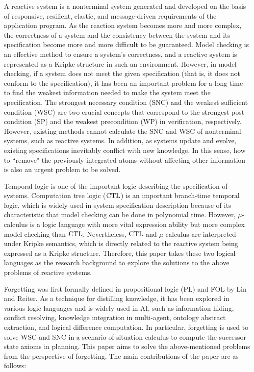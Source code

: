 \begin{englishabstract}
A reactive system is a nonterminal system generated and developed on the basis of responsive, resilient, elastic, and message-driven requirements of the application program.  As the reaction system becomes more and more complex, the correctness of a system and the consistency between the system and its specification become more and more difficult to be guaranteed. 	
Model checking is an effective method to ensure a system's correctness, and a reactive system is represented as a Kripke structure in such an environment.  However, in model checking, if a system does not meet the given specification (that is, it does not conform to the specification), it has been an important problem for a long time to find the weakest information needed to make the system meet the specification. 
The strongest necessary condition (SNC) and the weakest sufficient condition (WSC)  are two crucial concepts that correspond to the strongest post-condition (SP) and the weakest precondition (WP) in verification, respectively. However, existing methods cannot calculate the SNC and WSC of nonterminal systems, such as reactive systems. 
In addition, as systems update and evolve, existing specifications inevitably conflict with new knowledge. In this sense, how to ``remove" the previously integrated atoms without affecting other information is also an urgent problem to be solved. 
	
	
Temporal logic is one of the important logic describing the specification of systems.   Computation tree logic ($\textrm{CTL}$) is an important branch-time temporal logic, which is widely used in system specification description because of its characteristic that model checking can be done in polynomial time.  However, $\mu$-calculus is a logic language with more vital expression ability but more complex model checking than $\textrm{CTL}$. 
Nevertheless, $\textrm{CTL}$ and $\mu$-calculus are interpreted under Kripke semantics, which is directly related to the reactive system being expressed as a Kripke structure. 
Therefore, this paper takes these two logical languages as the research background to explore the solutions to the above problems of reactive systems. 


Forgetting was first formally defined in propositional logic (PL) and FOL by Lin and Reiter. As a technique for distilling knowledge, it has been explored in various logic languages and is widely used in AI, such as information hiding, conflict resolving, knowledge integration in multi-agent, ontology abstract extraction, and logical difference computation. In particular, forgetting is used to solve WSC and SNC in a scenario of situation calculus to compute the successor state axioms in planning. This paper aims to solve the above-mentioned problems from the perspective of forgetting. The main contributions of the paper are as follows: 



\end{englishabstract}
